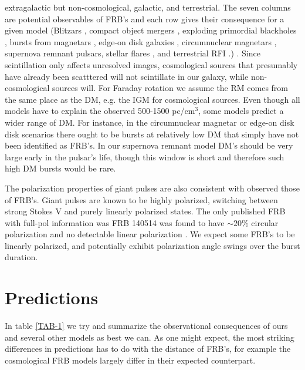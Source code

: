 \documentclass[useAMS,usenatbib]{mn2e}
\begin{document}
\begin{table}
{extragalactic but non-cosmological, galactic, and terrestrial. 
The seven columns are potential observables of FRB's and each
 row gives their consequence for a given model 
 (Blitzars \citep{2014A&A...562A.137F}, compact object mergers \citep{2012ApJ...760...64M, 2013PASJ...65L..12T},
 exploding primordial blackholes \citep{2014PhRvD..90l7503B}, bursts from magnetars \citep{2014MNRAS.442L...9L}, edge-on disk galaxies \citep{2015arXiv150400200X}, circumnuclear magnetars \citep{2015arXiv150101341P}, 
 supernova remnant pulsars, stellar flares \citep{2014MNRAS.439L..46L}, and terrestrial RFI 
 \citep{2015arXiv150305245H}.)
 . Since scintillation
only affects unresolved images, cosmological sources that presumably have already been scatttered
will not scintillate in our galaxy, while non-cosmological sources will. For Faraday rotation we assume 
the RM comes from the same place as the DM, e.g. the IGM for cosmological sources. Even though
all models have to explain the observed 500-1500 pc/cm$^3$, some models predict a wider 
range of DM. For instance, in the circumnuclear magnetar or edge-on disk disk scenarios there 
ought to be bursts at relatively low DM that simply have not been identified as FRB's. In our supernova 
remnant model DM's should be very large early in the pulsar's life, though this window is short and 
therefore such high DM bursts would be rare.}
\end{table}

The polarization properties of giant pulses are also consistent with
observed those of FRB's. Giant pulses are known to be highly polarized, 
switching between strong Stokes V and purely linearly polarized states. 
The only published FRB with full-pol information was FRB 140514 was 
found to have $\sim20\%$ circular polarization and no detectable 
linear polarization \citep{2014arXiv1412.0342P}.  We expect some FRB's
to be linearly polarized, and potentially exhibit polarization angle
swings over the burst duration.

\section{Predictions}
\label{sec-predictions}

In table \ref{TAB-1} we try and summarize the observational consequences
of ours and several other models as best we can. As one might expect,
the most striking differences in predictions has to do with the distance of FRB's,
for example the cosmological FRB models largely differ in their expected 
counterpart. 
\end{document}
